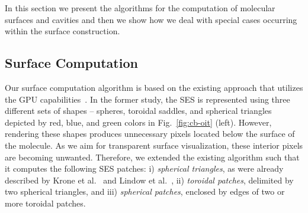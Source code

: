 In this section we present the algorithms for the computation of molecular surfaces and cavities and then we show how we deal with special cases occurring within the surface construction.

\subsection{Surface Computation}
\label{sec:ecb}
Our surface computation algorithm is based on the existing approach that utilizes the GPU capabilities~\cite{krone2011parallel}.
In the former study, the SES is represented using three different sets of shapes -- spheres, toroidal saddles, and spherical triangles depicted by red, blue, and green colors in Fig.~\ref{fig:cb-oit} (left).
However, rendering these shapes produces unnecessary pixels located below the surface of the molecule.
As we aim for transparent surface visualization, these interior pixels are becoming unwanted.
Therefore, we extended the existing algorithm such that it computes the following SES patches:
i) \textit{spherical triangles}, as were already described by Krone et al.~\cite{krone2011parallel} and Lindow et al.~\cite{lindow2010accelerated},
ii) \textit{toroidal patches}, delimited by two spherical triangles, and
iii) \textit{spherical patches}, enclosed by edges of two or more toroidal patches.

